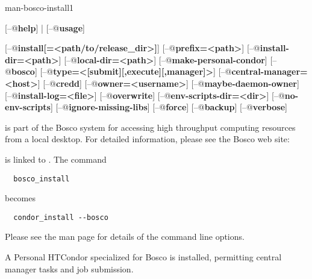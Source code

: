 \begin{ManPage}{}{man-bosco-install}{1}
{}


\Synopsis {}
[\verb@--@\textbf{help}] | [\verb@--@\textbf{usage}]

[\verb@--@\textbf{install[=<path/to/release\_dir>]}]
[\verb@--@\textbf{prefix=<path>}]
[\verb@--@\textbf{install-dir=<path>}]
[\verb@--@\textbf{local-dir=<path>}]
[\verb@--@\textbf{make-personal-condor}]
[\verb@--@\textbf{bosco}]
[\verb@--@\textbf{type=<[submit][,execute][,manager]>}]
[\verb@--@\textbf{central-manager=<host>}]
[\verb@--@\textbf{credd}]
[\verb@--@\textbf{owner=<username>}]
[\verb@--@\textbf{maybe-daemon-owner}]
[\verb@--@\textbf{install-log=<file>}]
[\verb@--@\textbf{overwrite}]
[\verb@--@\textbf{env-scripts-dir=<dir>}]
[\verb@--@\textbf{no-env-scripts}]
[\verb@--@\textbf{ignore-missing-libs}]
[\verb@--@\textbf{force}]
[\verb@--@\textbf{backup}]
[\verb@--@\textbf{verbose}]

\Description

 is part of the Bosco system for accessing high
throughput computing resources from a local desktop.
For detailed information, please see the Bosco web site:

 is linked to .
The command
\begin{verbatim}
  bosco_install
\end{verbatim}
becomes
\begin{verbatim}
  condor_install --bosco
\end{verbatim}
Please see the  man page
for details of the command line options.

A Personal HTCondor specialized for Bosco is installed,
permitting central manager tasks and job submission. 


\end{ManPage}

